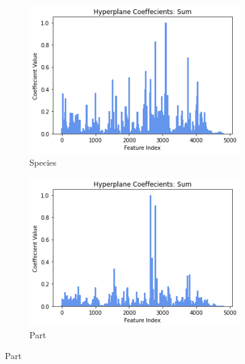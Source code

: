\documentclass[runningheads]{llncs}
\begin{document}
\begin{figure}[htb]
  \centering  
  \caption[Two numerical solutions]{    
    Hyperplane coefficients $\beta_t$.
    }
  \begin{subfigure}[b]{.55\linewidth}
    \includegraphics[width=\linewidth]{fish_total_coefficients.png}
    \caption{Species}\label{fig:fish-hyperplane-coeffcients}
  \end{subfigure}
  \begin{subfigure}[b]{.55\linewidth}
    \includegraphics[width=\linewidth]{part_total_coefficients.png}
    \caption{Part}\label{fig:part-hyperplane-coeffcients}
  \end{subfigure}
  \label{fig:hyperplane-coefficients}
\end{figure} 
\end{document}
